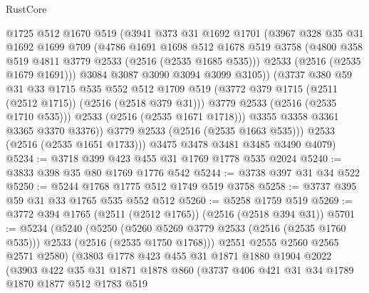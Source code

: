 \begin{lexlean}{RustCore}
\begin{coremodule}
                @1725
                @512
                @1670
                @519
                (@3941
                  @373
                  @31
                  @1692
                  @1701
                  (@3967
                    @328
                    @35
                    @31
                    @1692
                    @1699
                    @709
                    (@4786
                      @1691
                      @1698
                      @512
                      @1678
                      @519
                      @3758
                      (@4800 @358 @519 @4811 @3779 @2533 (@2516 (@2535 @1685 @535)))
                      @2533
                      (@2516 (@2535 @1679 @1691)))
                    @3084
                    @3087
                    @3090
                    @3094
                    @3099
                    @3105))
                (@3737
                  @380
                  @59
                  @31
                  @33
                  @1715
                  @535
                  @552
                  @512
                  @1709
                  @519
                  (@3772 @379 @1715 (@2511 (@2512 @1715)) (@2516 (@2518 @379 @31)))
                  @3779
                  @2533
                  (@2516 (@2535 @1710 @535)))
                @2533
                (@2516 (@2535 @1671 @1718)))
              @3355
              @3358
              @3361
              @3365
              @3370
              @3376))
          @3779
          @2533
          (@2516 (@2535 @1663 @535)))
        @2533
        (@2516 (@2535 @1651 @1733)))
      @3475
      @3478
      @3481
      @3485
      @3490
      @4079)
@5234 := @3718 @399 @423 @455 @31 @1769 @1778 @535 @2024
@5240 := @3833 @398 @35 @80 @1769 @1776 @542
@5244 := @3738 @397 @31 @34 @522
@5250 := @5244 @1768 @1775 @512 @1749 @519 @3758
@5258 := @3737 @395 @59 @31 @33 @1765 @535 @552 @512
@5260 := @5258 @1759 @519
@5269 := @3772 @394 @1765 (@2511 (@2512 @1765)) (@2516 (@2518 @394 @31))
@5701 := @5234
    (@5240
      (@5250 (@5260 @5269 @3779 @2533 (@2516 (@2535 @1760 @535))) @2533 (@2516 (@2535 @1750 @1768)))
      @2551
      @2555
      @2560
      @2565
      @2571
      @2580)
    (@3803
      @1778
      @423
      @455
      @31
      @1871
      @1880
      @1904
      @2022
      (@3903
        @422
        @35
        @31
        @1871
        @1878
        @860
        (@3737
          @406
          @421
          @31
          @34
          @1789
          @1870
          @1877
          @512
          @1783
          @519

\end{coremodule}
\end{lexlean}
